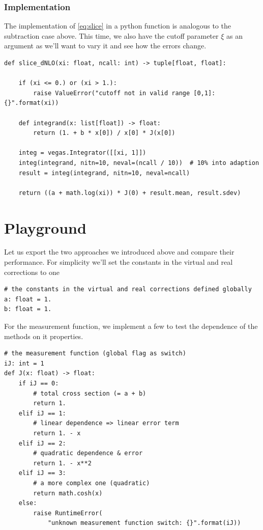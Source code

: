 \documentclass[11pt]{article}
\begin{document}
\subsubsection{Implementation}
\label{sec:orgc10afca}
The implementation of \eqref{eq:slice} in a python function is analogous to the subtraction case above.
This time, we also have the cutoff parameter \(\xi\) as an argument as we'll want to vary it and see how the errors change.
\begin{verbatim}
def slice_dNLO(xi: float, ncall: int) -> tuple[float, float]:

    if (xi <= 0.) or (xi > 1.):
        raise ValueError("cutoff not in valid range [0,1]: {}".format(xi))

    def integrand(x: list[float]) -> float:
        return (1. + b * x[0]) / x[0] * J(x[0])

    integ = vegas.Integrator([[xi, 1]])
    integ(integrand, nitn=10, neval=(ncall / 10))  # 10% into adaption
    result = integ(integrand, nitn=10, neval=ncall)

    return ((a + math.log(xi)) * J(0) + result.mean, result.sdev)
\end{verbatim}



\section{Playground}
\label{sec:org4668aea}
Let us export the two approaches we introduced above and compare their performance.
For simplicity we'll set the constants in the virtual and real corrections to one
\begin{verbatim}
# the constants in the virtual and real corrections defined globally
a: float = 1.
b: float = 1.
\end{verbatim}
For the measurement function, we implement a few to test the dependence of the methods on it properties.
\begin{verbatim}
# the measurement function (global flag as switch)
iJ: int = 1
def J(x: float) -> float:
    if iJ == 0:
        # total cross section (= a + b)
        return 1.
    elif iJ == 1:
        # linear dependence => linear error term
        return 1. - x
    elif iJ == 2:
        # quadratic dependence & error
        return 1. - x**2
    elif iJ == 3:
        # a more complex one (quadratic)
        return math.cosh(x)
    else:
        raise RuntimeError(
            "unknown measurement function switch: {}".format(iJ))
\end{verbatim}
\end{document}
